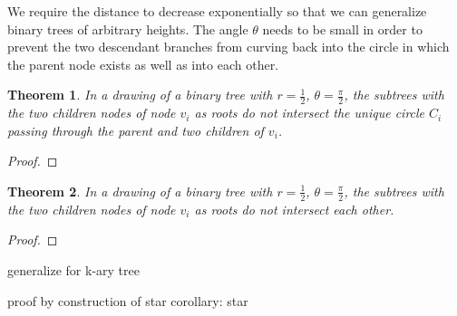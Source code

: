 \documentclass{NSF}
\newtheorem{theorem}{Theorem}[section]
\begin{document}
We require the distance to decrease exponentially so that we can generalize binary trees of arbitrary heights. The angle $\theta$ needs to be small in order to prevent the two descendant branches from curving back into the circle in which the parent node exists as well as into each other.

\begin{theorem}
In a drawing of a binary tree with $r=\frac{1}{2}$, $\theta=\frac{\pi}{2}$, the subtrees with the two children nodes of node $v_i$ as roots do not intersect the unique circle $C_i$ passing through the parent and two children of $v_i$.
\end{theorem}
\begin{proof}

\end{proof}

\begin{theorem}
In a drawing of a binary tree with $r=\frac{1}{2}$, $\theta=\frac{\pi}{2}$, the subtrees with the two children nodes of node $v_i$ as roots do not intersect each other.
\end{theorem}
\begin{proof}

\end{proof}

generalize for k-ary tree

proof by construction of star
corollary: star

\newpage
\end{document}
